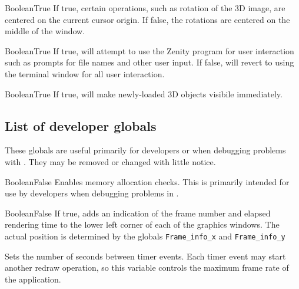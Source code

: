 {Boolean}{True}
{If true, certain operations, such as rotation of the 3D image, are centered on the current cursor origin. If false, the rotations are centered on the middle of the window.}{}

{Boolean}{True}
{If true, \display{} will attempt to use the Zenity program for user interaction
such as prompts for file names and other user input. If false, 
\display{} will revert to using the terminal window for all user interaction.}{}

{Boolean}{True}
{If true, \display{} will make newly-loaded 3D objects visibile immediately.}{}

\subsection{List of developer globals}
These globals are useful primarily for developers or when debugging problems
with \display. They may be removed or changed with little notice.

{Boolean}{False}
{Enables memory allocation checks. This is primarily intended for use by developers when debugging problems in \display.}{}

{Boolean}{False}
{If true, adds an indication of the frame number and elapsed rendering time to the lower left corner of each of the graphics windows. The actual position is determined by the globals {\tt Frame\_info\_x} and {\tt Frame\_info\_y}}{}

{Sets the number of seconds between timer events. Each timer event may
start another redraw operation, so this variable controls the maximum
frame rate of the application.}{}

